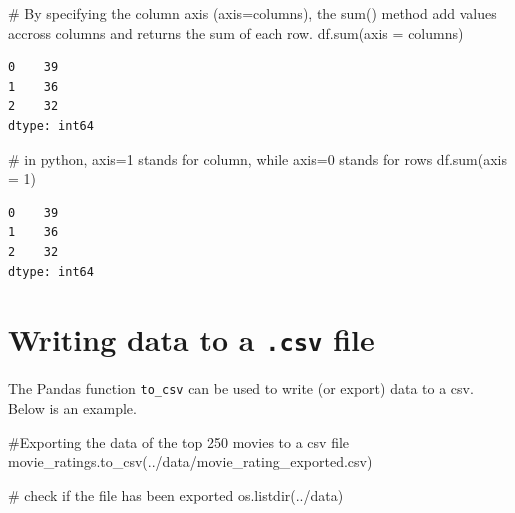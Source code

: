 \documentclass[
  letterpaper,
  DIV=11,
  numbers=noendperiod]{scrreprt}
\newenvironment{Shaded}{\begin{snugshade}}{\end{snugshade}}
\newcommand{\BuiltInTok}[1]{\textcolor[rgb]{0.00,0.23,0.31}{#1}}
\newcommand{\CommentTok}[1]{\textcolor[rgb]{0.37,0.37,0.37}{#1}}
\newcommand{\DecValTok}[1]{\textcolor[rgb]{0.68,0.00,0.00}{#1}}
\newcommand{\NormalTok}[1]{\textcolor[rgb]{0.00,0.23,0.31}{#1}}
\newcommand{\OperatorTok}[1]{\textcolor[rgb]{0.37,0.37,0.37}{#1}}
\newcommand{\StringTok}[1]{\textcolor[rgb]{0.13,0.47,0.30}{#1}}
\begin{document}
\begin{Shaded}
\begin{Highlighting}[]
\CommentTok{\# By specifying the column axis (axis=\textquotesingle{}columns\textquotesingle{}), the sum() method add values accross columns and returns the sum of each row.}
\NormalTok{df.}\BuiltInTok{sum}\NormalTok{(axis }\OperatorTok{=} \StringTok{\textquotesingle{}columns\textquotesingle{}}\NormalTok{)}
\end{Highlighting}
\end{Shaded}

\begin{verbatim}
0    39
1    36
2    32
dtype: int64
\end{verbatim}

\begin{Shaded}
\begin{Highlighting}[]
\CommentTok{\# in python, axis=1 stands for column, while axis=0 stands for rows}
\NormalTok{df.}\BuiltInTok{sum}\NormalTok{(axis }\OperatorTok{=} \DecValTok{1}\NormalTok{)}
\end{Highlighting}
\end{Shaded}

\begin{verbatim}
0    39
1    36
2    32
dtype: int64
\end{verbatim}

\hypertarget{writing-data-to-a-.csv-file}{%
\section{\texorpdfstring{Writing data to a \texttt{.csv}
file}{Writing data to a .csv file}}\label{writing-data-to-a-.csv-file}}

The Pandas function \texttt{to\_csv} can be used to write (or export)
data to a csv. Below is an example.

\begin{Shaded}
\begin{Highlighting}[]
\CommentTok{\#Exporting the data of the top 250 movies to a csv file}
\NormalTok{movie\_ratings.to\_csv(}\StringTok{\textquotesingle{}../data/movie\_rating\_exported.csv\textquotesingle{}}\NormalTok{)}
\end{Highlighting}
\end{Shaded}

\begin{Shaded}
\begin{Highlighting}[]
\CommentTok{\# check if the file has been exported}
\NormalTok{os.listdir(}\StringTok{\textquotesingle{}../data\textquotesingle{}}\NormalTok{)}
\end{Highlighting}
\end{Shaded}
\end{document}
